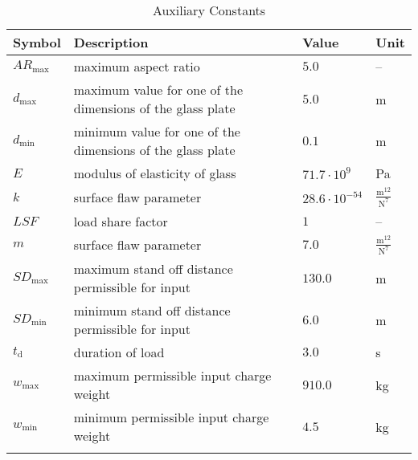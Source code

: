 \documentclass[12pt]{article}
\begin{document}
\begin{longtabu}{l X[l] l l}
\toprule
\textbf{Symbol} & \textbf{Description} & \textbf{Value} & \textbf{Unit}
\\
\midrule
\endhead
${AR_{\text{max}}}$ & maximum aspect ratio & $5.0$ & --
\\
${d_{\text{max}}}$ & maximum value for one of the dimensions of the glass plate & $5.0$ & m
\\
${d_{\text{min}}}$ & minimum value for one of the dimensions of the glass plate & $0.1$ & m
\\
$E$ & modulus of elasticity of glass & $71.7\cdot{}10^{9}$ & Pa
\\
$k$ & surface flaw parameter & $28.6\cdot{}10^{-54}$ & $\frac{\text{m}^{12}}{\text{N}^{7}}$
\\
$LSF$ & load share factor & $1$ & --
\\
$m$ & surface flaw parameter & $7.0$ & $\frac{\text{m}^{12}}{\text{N}^{7}}$
\\
${SD_{\text{max}}}$ & maximum stand off distance permissible for input & $130.0$ & m
\\
${SD_{\text{min}}}$ & minimum stand off distance permissible for input & $6.0$ & m
\\
${t_{\text{d}}}$ & duration of load & $3.0$ & s
\\
${w_{\text{max}}}$ & maximum permissible input charge weight & $910.0$ & kg
\\
${w_{\text{min}}}$ & minimum permissible input charge weight & $4.5$ & kg
\\
\bottomrule
\caption{Auxiliary Constants}
\label{Table:TAuxConsts}
\end{longtabu}
\end{document}
